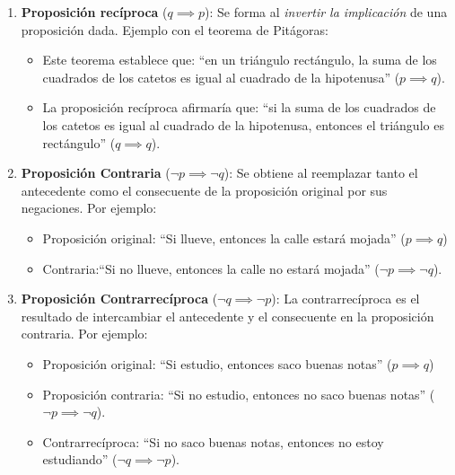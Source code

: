 \begin{enumerate}
	\item \textbf{Proposición recíproca} ($q \implies p$): Se forma al \textit{invertir la implicación} de una proposición dada. Ejemplo con el teorema de Pitágoras:  
	\begin{itemize}
		\item Este teorema establece que: ``en un triángulo rectángulo, la suma de los cuadrados de los catetos es igual al cuadrado de la hipotenusa'' ($p \implies q$).
		
		
		\item La proposición recíproca afirmaría que: ``si la suma de los cuadrados de los catetos es igual al cuadrado de la hipotenusa, entonces el triángulo es rectángulo'' ($q \implies q$).
	\end{itemize}
	
	\item \textbf{Proposición Contraria} ($\neg p \implies \neg q$):  
	Se obtiene al reemplazar tanto el antecedente como el consecuente de la proposición original por sus negaciones. Por ejemplo:
	
	\begin{itemize}
		\item Proposición original: ``Si llueve, entonces la calle estará mojada'' ($p \implies q$)
		\item Contraria:``Si no llueve, entonces la calle no estará mojada'' ($\neg p \implies \neg q$).
	\end{itemize}
	
	\item \textbf{Proposición Contrarrecíproca} ($\neg q \implies \neg p$): La contrarrecíproca es el resultado de intercambiar el antecedente y el consecuente en la proposición contraria. Por ejemplo:  
	\begin{itemize}
		\item Proposición original: ``Si estudio, entonces saco buenas notas'' ($p \implies q$)
		\item Proposición contraria: ``Si no estudio, entonces no saco buenas notas'' ($\neg p \implies \neg q$).
		\item Contrarrecíproca: ``Si no saco buenas notas, entonces no estoy estudiando'' ($\neg q \implies \neg p$).
	\end{itemize}
\end{enumerate}

